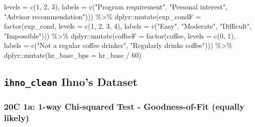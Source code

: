 \documentclass[
]{article}
\newenvironment{Shaded}{\begin{snugshade}}{\end{snugshade}}
\newcommand{\AttributeTok}[1]{\textcolor[rgb]{0.77,0.63,0.00}{#1}}
\newcommand{\DecValTok}[1]{\textcolor[rgb]{0.00,0.00,0.81}{#1}}
\newcommand{\FunctionTok}[1]{\textcolor[rgb]{0.00,0.00,0.00}{#1}}
\newcommand{\NormalTok}[1]{#1}
\newcommand{\SpecialCharTok}[1]{\textcolor[rgb]{0.00,0.00,0.00}{#1}}
\newcommand{\StringTok}[1]{\textcolor[rgb]{0.31,0.60,0.02}{#1}}
\begin{document}
\begin{Shaded}
\begin{Highlighting}[]
                                 \AttributeTok{levels =} \FunctionTok{c}\NormalTok{(}\DecValTok{1}\NormalTok{, }\DecValTok{2}\NormalTok{, }\DecValTok{3}\NormalTok{),}
                                 \AttributeTok{labels =} \FunctionTok{c}\NormalTok{(}\StringTok{"Program requirement"}\NormalTok{,}
                                            \StringTok{"Personal interest"}\NormalTok{,}
                                            \StringTok{"Advisor recommendation"}\NormalTok{))) }\SpecialCharTok{\%\textgreater{}\%} 
\NormalTok{  dplyr}\SpecialCharTok{::}\FunctionTok{mutate}\NormalTok{(}\AttributeTok{exp\_condF =} \FunctionTok{factor}\NormalTok{(exp\_cond,}
                                   \AttributeTok{levels =} \FunctionTok{c}\NormalTok{(}\DecValTok{1}\NormalTok{, }\DecValTok{2}\NormalTok{, }\DecValTok{3}\NormalTok{, }\DecValTok{4}\NormalTok{),}
                                   \AttributeTok{labels =} \FunctionTok{c}\NormalTok{(}\StringTok{"Easy"}\NormalTok{,}
                                              \StringTok{"Moderate"}\NormalTok{,}
                                              \StringTok{"Difficult"}\NormalTok{,}
                                              \StringTok{"Impossible"}\NormalTok{))) }\SpecialCharTok{\%\textgreater{}\%} 
\NormalTok{  dplyr}\SpecialCharTok{::}\FunctionTok{mutate}\NormalTok{(}\AttributeTok{coffeeF =} \FunctionTok{factor}\NormalTok{(coffee,}
                                 \AttributeTok{levels =} \FunctionTok{c}\NormalTok{(}\DecValTok{0}\NormalTok{, }\DecValTok{1}\NormalTok{),}
                                 \AttributeTok{labels =} \FunctionTok{c}\NormalTok{(}\StringTok{"Not a regular coffee drinker"}\NormalTok{,}
                                            \StringTok{"Regularly drinks coffee"}\NormalTok{)))  }\SpecialCharTok{\%\textgreater{}\%} 
\NormalTok{  dplyr}\SpecialCharTok{::}\FunctionTok{mutate}\NormalTok{(}\AttributeTok{hr\_base\_bps =}\NormalTok{ hr\_base }\SpecialCharTok{/} \DecValTok{60}\NormalTok{) }
\end{Highlighting}
\end{Shaded}

\clearpage

\hypertarget{ihno_clean-ihnos-dataset}{%
\subsection{\texorpdfstring{\texttt{ihno\_clean} Ihno's
Dataset}{ihno\_clean Ihno's Dataset}}\label{ihno_clean-ihnos-dataset}}

\hypertarget{c-1a-1-way-chi-squared-test---goodness-of-fit-equally-likely}{%
\subsubsection{20C 1a: 1-way Chi-squared Test - Goodness-of-Fit (equally
likely)}\label{c-1a-1-way-chi-squared-test---goodness-of-fit-equally-likely}}
\end{document}
